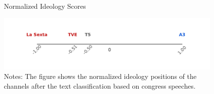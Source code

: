 \documentclass[12pt]{article}
\begin{document}
	
	
	\begin{figure}[H]
		\centering
		\caption{Normalized Ideology Scores}
		\includegraphics[width=120mm]{figures/congress_line}
		\caption*{\small Notes: The figure shows the normalized ideology positions of the channels after the text classification based on congress speeches. }
		\label{fig:congress_line}
	\end{figure}
	

	
	
\end{document}
